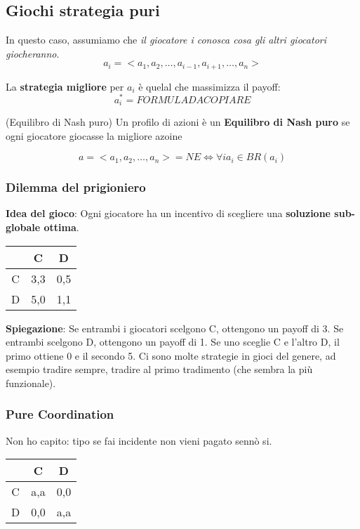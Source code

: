 \subsection{Giochi strategia puri}
In questo caso, assumiamo che \textit{il giocatore i conosca cosa gli altri
    giocatori giocheranno}.
\[
    a_i = <a_1,a_2,\dots,a_{i-1}, a_{i+1}, \dots, a_n>
\]

La \textbf{strategia migliore} per $a_i$ è quelal che massimizza il payoff:
\[
    a_i^* = FORMULA DA COPIARE
\]

\begin{definition}(Equilibro di Nash puro)
    Un profilo di azioni è un \textbf{Equilibro di Nash puro} se ogni giocatore giocasse la migliore azoine
\end{definition}

\[
    a = <a_1, a_2, \dots, a_n>  =  NE \iff \forall i a_i \in BR(a_i)
\]

\subsubsection{Dilemma del prigioniero}
\textbf{Idea del gioco}: Ogni giocatore ha un incentivo di scegliere una \textbf{soluzione sub-globale ottima}.

\begin{table}[H]
    \begin{center}
        \begin{tabular}{|c|c|c|}
            \hline
              & C   & D   \\
            \hline
            C & 3,3 & 0,5 \\
            \hline
            D & 5,0 & 1,1 \\
            \hline
        \end{tabular}
    \end{center}
\end{table}

\textbf{Spiegazione}: Se entrambi i giocatori scelgono C, ottengono un payoff di 3. Se entrambi scelgono D, ottengono un payoff di 1. Se uno sceglie C e l'altro D, il primo ottiene 0 e il secondo 5.
Ci sono molte strategie in gioci del genere, ad esempio tradire sempre, tradire al primo tradimento (che sembra la più funzionale).

\subsubsection{Pure Coordination}
Non ho capito: tipo se fai incidente non vieni pagato sennò si.
\begin{table}[H]
    \begin{center}
        \begin{tabular}{|c|c|c|}
            \hline
              & C   & D   \\
            \hline
            C & a,a & 0,0 \\
            \hline
            D & 0,0 & a,a \\
            \hline
        \end{tabular}
    \end{center}
\end{table}

